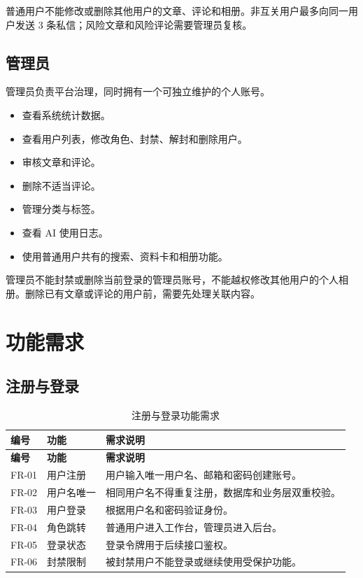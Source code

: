\documentclass[UTF8,a4paper,12pt]{ctexart}
\begin{document}
普通用户不能修改或删除其他用户的文章、评论和相册。非互关用户最多向同一用户发送 3 条私信；风险文章和风险评论需要管理员复核。

\subsection{管理员}

管理员负责平台治理，同时拥有一个可独立维护的个人账号。

\begin{itemize}
  \item 查看系统统计数据。
  \item 查看用户列表，修改角色、封禁、解封和删除用户。
  \item 审核文章和评论。
  \item 删除不适当评论。
  \item 管理分类与标签。
  \item 查看 AI 使用日志。
  \item 使用普通用户共有的搜索、资料卡和相册功能。
\end{itemize}

管理员不能封禁或删除当前登录的管理员账号，不能越权修改其他用户的个人相册。删除已有文章或评论的用户前，需要先处理关联内容。

\section{功能需求}

\subsection{注册与登录}

\begin{longtable}{>{\centering\arraybackslash}p{2.1cm}p{3.3cm}p{8.6cm}}
\caption{注册与登录功能需求}\\
\toprule
\rowcolor{tablehead}\textbf{编号} & \textbf{功能} & \textbf{需求说明}\\
\midrule
\endfirsthead
\toprule
\rowcolor{tablehead}\textbf{编号} & \textbf{功能} & \textbf{需求说明}\\
\midrule
\endhead
FR-01 & 用户注册 & 用户输入唯一用户名、邮箱和密码创建账号。\\
FR-02 & 用户名唯一 & 相同用户名不得重复注册，数据库和业务层双重校验。\\
FR-03 & 用户登录 & 根据用户名和密码验证身份。\\
FR-04 & 角色跳转 & 普通用户进入工作台，管理员进入后台。\\
FR-05 & 登录状态 & 登录令牌用于后续接口鉴权。\\
FR-06 & 封禁限制 & 被封禁用户不能登录或继续使用受保护功能。\\
\bottomrule
\end{longtable}
\end{document}
